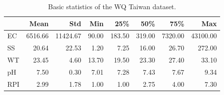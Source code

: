 \begin{table}
\centering
\caption{Basic statistics of the WQ Taiwan dataset.}
\label{tab:basic_stats}
\begin{tabular}{lrrrrrrr}
\toprule
{} &    Mean &      Std &   Min &    25\% &    50\% &     75\% &      Max \\
\midrule
EC  & 6516.66 & 11424.67 & 90.00 & 183.50 & 319.00 & 7320.00 & 43100.00 \\
SS  &   20.64 &    22.53 &  1.20 &   7.25 &  16.00 &   26.70 &   272.00 \\
WT  &   23.45 &     4.60 & 13.70 &  19.50 &  23.30 &   27.40 &    33.10 \\
pH  &    7.50 &     0.30 &  7.01 &   7.28 &   7.43 &    7.67 &     9.34 \\
RPI &    2.99 &     1.78 &  1.00 &   1.00 &   2.75 &    4.00 &     7.30 \\
\bottomrule
\end{tabular}
\end{table}
